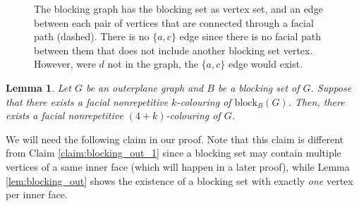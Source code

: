 \documentclass{patmorin}
\newcommand{\block}{\mathrm{block}}
\newtheorem{lemma}[theorem]{Lemma}
\begin{document}
\begin{figure}[!ht]
  \centering
  
  
    \caption{The blocking graph has the blocking set as vertex set, and an edge between each pair of vertices that are connected through a facial path (dashed). There is no $\{a,c\}$ edge since there is no facial path between them that does not include another blocking set vertex. However, were $d$ not in the graph, the $\{a,c\}$ edge would exist.}

  \label{fig:blockingsetex}  
\end{figure}

\begin{lemma}
 Let $G$ be an outerplane graph and $B$ be a blocking set of $G$. Suppose that there exists a facial nonrepetitive $k$-colouring of $\block_{B}(G)$. Then, there exists a facial nonrepetitive $(4+k)$-colouring of $G$.
 \label{lem:hitting_plus_four}
\end{lemma}
We will need the following claim in our proof. Note that this claim is different from Claim \ref{claim:blocking_out_1} since a blocking set may contain multiple vertices of a same inner face (which will happen in a later proof), while Lemma \ref{lem:blocking_out} shows the existence of a blocking set with exactly \emph{one} vertex per inner face.
 
\end{document}
